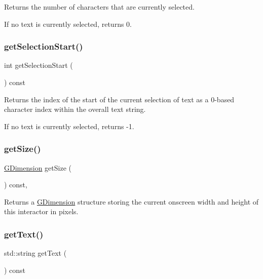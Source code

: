 Returns the number of characters that are currently selected. 

If no text is currently selected, returns 0. \mbox{\label{classGTextArea_aad7c986a677c1b9cf445cd7cfb6a8975}} 
\subsubsection{\texorpdfstring{get\+Selection\+Start()}{getSelectionStart()}}
{\footnotesize\ttfamily int get\+Selection\+Start (\begin{DoxyParamCaption}{ }\end{DoxyParamCaption}) const\hspace{0.3cm}{\ttfamily [virtual]}}



Returns the index of the start of the current selection of text as a 0-\/based character index within the overall text string. 

If no text is currently selected, returns -\/1. \mbox{\label{classGInteractor_a7b4eec96a2bdc6420695d5796a78eea9}} 
\subsubsection{\texorpdfstring{get\+Size()}{getSize()}}
{\footnotesize\ttfamily \mbox{\hyperlink{classGDimension}{G\+Dimension}} get\+Size (\begin{DoxyParamCaption}{ }\end{DoxyParamCaption}) const\hspace{0.3cm}{\ttfamily [virtual]}, {\ttfamily [inherited]}}



Returns a \mbox{\hyperlink{classGDimension}{G\+Dimension}} structure storing the current onscreen width and height of this interactor in pixels. 

\mbox{\label{classGTextArea_aff553c50924b836c29f146ed34a7c6ec}} 
\subsubsection{\texorpdfstring{get\+Text()}{getText()}}
{\footnotesize\ttfamily std\+::string get\+Text (\begin{DoxyParamCaption}{ }\end{DoxyParamCaption}) const\hspace{0.3cm}{\ttfamily [virtual]}}



